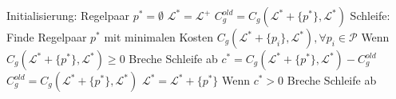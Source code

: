 \begin{algorithm}[caption={Generalisieren eines L-Systems mit Gewichtung $w_0$}]
    Initialisierung:
        Regelpaar $p^* = \emptyset$
        $\mathcal{L}^* = \mathcal{L}^+$
        $C_g^{old} = C_g(\mathcal{L}^* + \{p^*\}, \mathcal{L}^*)$
    Schleife:
        Finde Regelpaar $p^*$ mit minimalen Kosten $C_g(\mathcal{L}^* + \{p_i\}, \mathcal{L}^*), \forall p_i \in \mathcal{P}$
        Wenn $C_g(\mathcal{L}^* + \{p^*\}, \mathcal{L}^*) \geq 0$
            Breche Schleife ab
        $c^* = C_g(\mathcal{L}^* + \{p^*\}, \mathcal{L}^*) - C_g^{old}$
        $C_g^{old} = C_g(\mathcal{L}^* + \{p^*\}, \mathcal{L}^*)$
        $\mathcal{L}^* = \mathcal{L}^* + \{p^*\}$
        Wenn $c^* > 0$
            Breche Schleife ab
\end{algorithm}